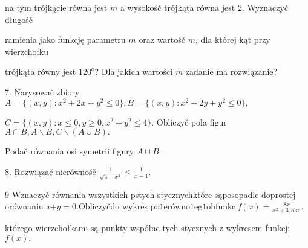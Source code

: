 \documentclass[a4paper,12pt]{article}
\begin{document}
na tym trójkącie równa jest $m$ a wysokośč trójkąta równa jest 2. Wyznaczyč długośč

ramienia jako funkcję parametru $m$ oraz wartośč $m$, dla której kąt przy wierzchofku

trójkąta równy jest $120^{\mathrm{o}}$? Dla jakich wartości $m$ zadanie ma rozwiązanie?

7. Narysowač zbiory $A=\{(x,y):x^{2}+2x+y^{2}\leq 0\}, B= \{(x,y):x^{2}+2y+y^{2}\leq 0\},$

$C=\{(x,y):x\leq 0,y\geq 0,x^{2}+y^{2}\leq 4\}$. Obliczyč pola figur $A\cap B, A\backslash B, C\backslash (A\cup B).$

Podač równania osi symetrii figury $A\cup B.$

8. Rozwiązač nierównośč $\displaystyle \frac{1}{\sqrt{4-x^{2}}}\leq\frac{1}{x-1}.$

9 $\mathrm{W}\mathrm{z}$naczyč równania wszystkich pstych stycznychktóre s$\text{ą} \mathrm{p}\mathrm{o}\mathrm{s}\mathrm{o}$padle d$\mathrm{o}\mathrm{p}$rostej orównaniu {\it x}$+y=0.$Obliczyčdo wykres p$\mathrm{o}1\mathrm{e}\mathrm{r}\text{ó} \mathrm{w}\mathrm{n}\mathrm{o}1\mathrm{e}\mathrm{g}1$obfunkc {\it f}$(x)=\displaystyle \frac{8x}{x^{2}+3,\mathrm{o}\mathrm{k}\mathrm{u}},$

którego wierzchołkami są punkty wspólne tych stycznych $\mathrm{z}$ wykresem funkcji $f(x).$
\end{document}
